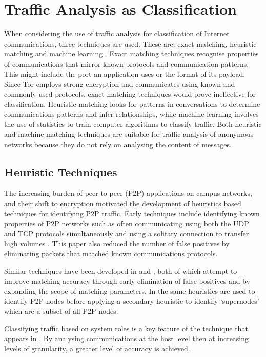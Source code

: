 \documentclass{ecuthesis}
\begin{document}
\section{Traffic Analysis as Classification}

When considering the use of traffic analysis for classification of Internet
communications, three techniques are used. These are: exact matching, heuristic
matching and machine learning \parencite{Zhang:2009p1188}. Exact matching
techniques recognise properties of communications that mirror known protocols
and communication patterns. This might include the port an application uses or
the format of its payload. Since Tor employs strong encryption and communicates
using known and commonly used protocols, exact matching techniques would prove
ineffective for classification. Heuristic matching looks for patterns in
conversations to determine communications patterns and infer relationships,
while machine learning involves the use of statistics to train computer
algorithms to classify traffic. Both heuristic and machine matching techniques
are suitable for traffic analysis of anonymous networks because they do not
rely on analysing the content of messages.

\subsection{Heuristic Techniques}

The increasing burden of peer to peer (P2P) applications on campus networks,
and their shift to encryption motivated the development of heuristics based
techniques for identifying P2P traffic. Early techniques include identifying
known properties of P2P networks such as often communicating using both the UDP
and TCP protocols simultaneously and using a solitary connection to transfer
high volumes \parencite{Karagiannis:2004p6400}. This paper also reduced the
number of false positives by eliminating packets that matched known
communications protocols.

Similar techniques have been developed in \textcite{Perenyi:2006p6325} and
\textcite{John:2008p1376}, both of which attempt to improve matching accuracy
through early elimination of false positives and by expanding the scope of
matching parameters. In \textcite{Oneil:2004p6451} the same heuristics are used
to identify P2P nodes before applying a secondary heuristic to identify
‘supernodes’ which are a subset of all P2P nodes.

Classifying traffic based on system roles is a key feature of the technique
that appears in 
\parencite{Karagiannis:2005p6359}. By analysing communications at the host
level then at increasing levels of granularity, a greater level of accuracy is
achieved.
\end{document}
